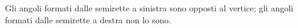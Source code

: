 {Gli angoli formati dalle semirette a sinistra sono opposti al vertice; gli angoli formati dalle semirette a destra non lo sono.

\begin{comment}

Sappiamo che nel corso degli studi o nell’attività lavorativa possono presentarsi problemi di diversa natura: di tipo economico, scientifico, sociale; possono riguardare insiemi numerici o figure geometriche. La matematica ci può aiutare a risolvere i problemi quando essi possono essere tradotti in “forma matematica”, quando cioè è possibile trascrivere in simboli le relazioni che intercorrono tra le grandezze presenti nel problema e quando si può costruire, tramite queste relazioni, un modello matematico che ci permetta di raggiungere la soluzione al quesito.

Affronteremo problemi di tipo algebrico o geometrico, che potranno essere formalizzati attraverso equazioni di secondo grado in una sola incognita.
Teniamo presente, prima di buttarci nella risoluzione del problema, alcuni passi che ci aiuteranno a costruire il modello matematico:
\begin{itemize*}
\item la lettura “attenta” del testo al fine di individuare l’ambiente del problema, le parole chiave, i dati e le informazioni implicite, l’obiettivo;
\item la scelta della grandezza incognita del problema, la descrizione dell’insieme in cui si ricerca il suo valore, le condizioni che devono essere soddisfatte dall’incognita;
\item la traduzione in “forma matematica” delle relazioni che intercorrono tra i dati e l’obiettivo, cioè l’individuazione del modello matematico (equazione risolvente).
\end{itemize*}
\begin{center}
 
\end{center}

\begin{center}
 
\end{center}

\begin{center}
 
\end{center}

\begin{center}
 
\end{center}


\end{comment}}
